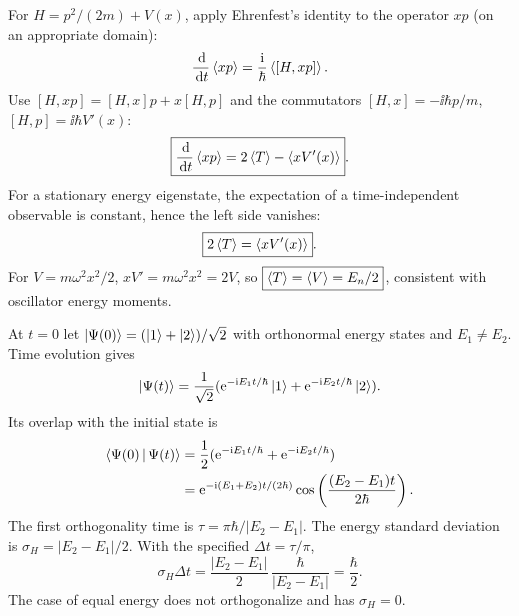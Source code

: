 For $H=p^2/(2m)+V(x)$, apply
Ehrenfest's identity to the operator $xp$
(on an appropriate domain):
\begin{equation}
\frac{\,\mathrm{d}}{\,\mathrm{d} t}\left\langle xp\right\rangle=
\frac{\mathrm{i}}{\hbar}\left\langle[H,xp]\right\rangle.
\end{equation}
Use $[H,xp]=[H,x]p+x[H,p]$
and the commutators
$[H,x]=-\ii\hbar p/m$,
$[H,p]=\ii\hbar V'(x)$:
\begin{equation}
\boxed{\frac{\,\mathrm{d}}{\,\mathrm{d} t}\left\langle xp\right\rangle
=2\left\langle T\right\rangle-\left\langle xV'(x)\right\rangle}.
\end{equation}
For a stationary energy eigenstate, the
expectation of a time-independent observable
is constant, hence the left side vanishes:
\begin{equation}
\boxed{2\left\langle T\right\rangle=\left\langle xV'(x)\right\rangle}.
\end{equation}
For $V=m\omega^2x^2/2$,
$xV'=m\omega^2x^2=2V$,
so $\boxed{\left\langle T\right\rangle=\left\langle V\right\rangle=E_n/2}$,
consistent with oscillator energy moments.

At $t=0$ let
$\left|\Psi(0)\right\rangle=(\left|1\right\rangle+\left|2\right\rangle)/\sqrt2$
with orthonormal energy states and
$E_1\ne E_2$.
Time evolution gives
\begin{equation}
\left|\Psi(t)\right\rangle=\frac1{\sqrt2}
(\mathrm{e}^{-\mathrm{i} E_1t/\hbar}\left|1\right\rangle+
\mathrm{e}^{-\mathrm{i} E_2t/\hbar}\left|2\right\rangle).
\end{equation}
Its overlap with the initial state is
\begin{align}
\left\langle\Psi(0)\,\middle|\,\Psi(t)\right\rangle
&=\frac12(\mathrm{e}^{-\mathrm{i} E_1t/\hbar}
+\mathrm{e}^{-\mathrm{i} E_2t/\hbar})\\
&=\mathrm{e}^{-\mathrm{i}(E_1+E_2)t/(2\hbar)}
\cos\left(\frac{(E_2-E_1)t}{2\hbar}\right).
\end{align}
The first orthogonality time is
$\boxed{\tau=\pi\hbar/|E_2-E_1|}$.
The energy standard deviation is
$\boxed{\sigma_H=|E_2-E_1|/2}$.
With the specified $\Delta t=\tau/\pi$,
\begin{equation}
\boxed{\sigma_H\Delta t=
\frac{|E_2-E_1|}{2}\,
\frac{\hbar}{|E_2-E_1|}
=\frac{\hbar}{2}}.
\end{equation}
The case of equal energy does not
orthogonalize and has $\sigma_H=0$.

